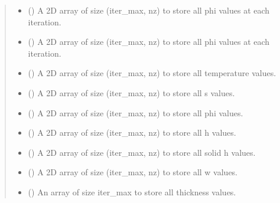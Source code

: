 \documentclass[a4paper,11pt,english,openany]{sphinxmanual}
\begin{document}
\begin{fulllineitems}
\begin{fulllineitems}
\begin{quote}
\begin{description}
\begin{itemize}
\item {} 
\sphinxAtStartPar
{} () \textendash{} A 2D array of size (iter\_max, nz) to store all phi values at each iteration.

\item {} 
\sphinxAtStartPar
{} () \textendash{} A 2D array of size (iter\_max, nz) to store all phi values at each iteration.

\item {} 
\sphinxAtStartPar
{} () \textendash{} A 2D array of size (iter\_max, nz) to store all temperature values.

\item {} 
\sphinxAtStartPar
{} () \textendash{} A 2D array of size (iter\_max, nz) to store all s values.

\item {} 
\sphinxAtStartPar
{} () \textendash{} A 2D array of size (iter\_max, nz) to store all phi values.

\item {} 
\sphinxAtStartPar
{} () \textendash{} A 2D array of size (iter\_max, nz) to store all h values.

\item {} 
\sphinxAtStartPar
{} () \textendash{} A 2D array of size (iter\_max, nz) to store all solid h values.

\item {} 
\sphinxAtStartPar
{} () \textendash{} A 2D array of size (iter\_max, nz) to store all w values.

\item {} 
\sphinxAtStartPar
{} () \textendash{} An array of size iter\_max to store all thickness values.


\end{itemize}
\end{description}
\end{quote}
\end{fulllineitems}
\end{fulllineitems}
\end{document}
